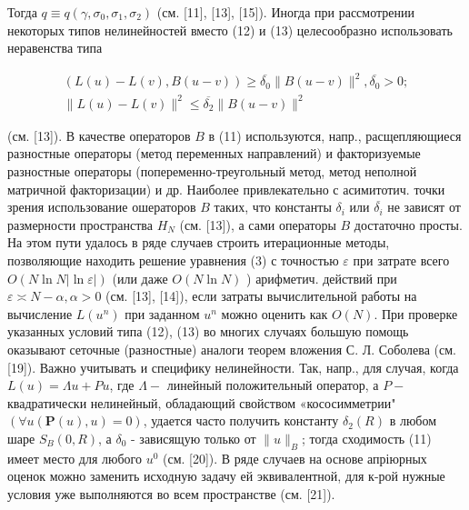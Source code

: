 \documentclass[10pt]{article}
\begin{document}
Тогда $q \equiv q\left(\gamma, \sigma_{0}, \sigma_{1}, \sigma_{2}\right)$ (см. [11], [13], [15]). Иногда при рассмотрении некоторых типов нелинейностей вместо (12) и (13) целесообразно использовать неравенства типа



\[

\begin{gathered}

(L(u)-L(v), B(u-v)) \geqslant \overline{\delta_{0}}\|B(u-v)\|^{2}, \overline{\delta_{0}}>0 ; \\

\|L(u)-L(v)\|^{2} \leqslant \overline{\delta_{2}}\|B(u-v)\|^{2}

\end{gathered}

\]



(см. [13]). В качестве операторов $B$ в (11) используются, напр., расщепляющиеся разностные операторы (метод переменных направлений) и факторизуемые разностные операторы (попеременно-треугольный метод, метод неполной матричной факторизации) и др. Наиболее привлекательно с асимитотич. точки зрения использование ошераторов $B$ таких, что константы $\delta_{i}$ или $\overline{\delta_{i}}$ не зависят от размерности пространства $H_{N}$ (см. [13]), а сами операторы $B$ достаточно просты. На этом пути удалось в ряде случаев строить итерационные методы, позволяющие находить решение уравнения (3) с точностью $\varepsilon$ при затрате всего $O(N \ln N|\ln \varepsilon|)$ (или даже $O(N \ln N)$ ) арифметич. действий при $\varepsilon \asymp N-\alpha, \alpha>0$ (см. [13], [14]), если затраты вычислительной работы на вычисление $L\left(u^{n}\right)$ при заданном $u^{n}$ можно оценить как $O(N)$. При проверке указанных условий типа (12), (13) во многих случаях большую помощь оказывают сеточные (разностные) аналоги теорем вложения С. Л. Соболева (см. [19]). Важно учитывать и специфику нелинейности. Так, напр., для случая, когда $L(u)=\Lambda u+P u$, где $\Lambda-$ линейный положительный оператор, а $P-$ квадратически нелинейный, обладающий свойством «кососимметрии" $(\forall u(\boldsymbol{P}(u), u)=0)$, удается часто получить константу $\delta_{2}(R)$ в любом шаре $S_{B}(0, R)$, а $\delta_{0}$ - зависящую только от $\|u\|_{B}$; тогда сходимость (11) имеет место для любого $u^{0}$ (см. [20]). В ряде случаев на основе апріюрных оценок можно заменить исходную задачу ей эквивалентной, для к-рой нужные условия уже выполняются во всем пространстве (см. [21]).
\end{document}
